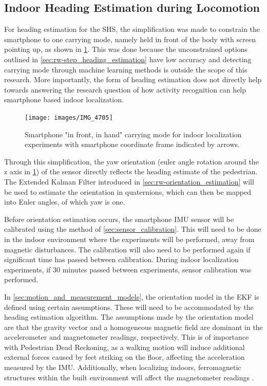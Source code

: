 \newpage
\subsection{Indoor Heading Estimation during Locomotion}
\label{sec:meth-indoor_heading_estimation}
For heading estimation for the \ac{SHS}, the simplification was made to constrain the smartphone to one carrying mode, namely held in front of the body with screen pointing up, as shown in \cref{fig:experiment_carrying_position}. This was done because the unconstrained options outlined in \cref{sec:rw-step_heading_estimation} have low accuracy and detecting carrying mode through machine learning methods is outside the scope of this research. More importantly, the form of heading estimation does not directly help towards answering the research question of how activity recognition can help smartphone based indoor localization.\par 
\begin{figure}[H]
	\centering
	\texttt{[image: images/IMG\_4705]}
	\caption{Smartphone "in front, in hand" carrying mode for indoor localization experiments with smartphone coordinate frame indicated by arrows.}
	\label{fig:experiment_carrying_position}
\end{figure}
Through this simplification, the yaw orientation (euler angle rotation around the z axis in \cref{fig:experiment_carrying_position}) of the sensor directly reflects the heading estimate of the pedestrian. The Extended Kalman Filter introduced in \cref{sec:rw-orientation_estimation} will be used to estimate the orientation in quaternions, which can then be mapped into Euler angles, of which yaw is one. \par 

Before orientation estimation occurs, the smartphone \ac{IMU} sensor will be calibrated using the method of \cref{sec:sensor_calibration}. This will need to be done in the indoor environment where the experiments will be performed, away from magnetic disturbances. The calibration will also need to be performed again if significant time has passed between calibration. During indoor localization experiments, if 30 minutes passed between experiments, sensor calibration was performed.\par 

In \cref{sec:motion_and_measurement_models}, the orientation model in the EKF is defined using certain assumptions. These will need to be accommodated by the heading estimation algorithm.
The assumptions made by the orientation model  are that the gravity vector and a homogeneous magnetic field are dominant in the accelerometer and magnetometer readings, respectively. This is of importance with Pedestrian Dead Reckoning, as a walking motion will induce additional external forces caused by feet striking on the floor, affecting the acceleration measured by the IMU. Additionally, when localizing indoors, ferromagnetic structures within the built environment will affect the magnetometer readings \cite{Michel2015a}.\par 

